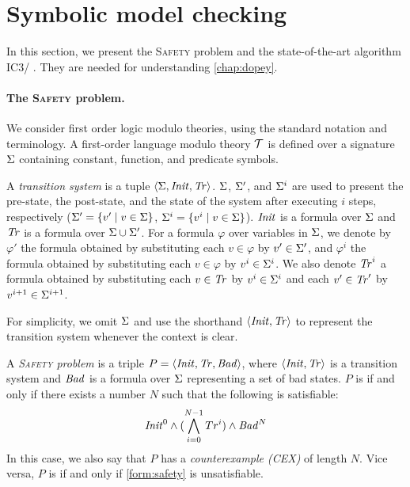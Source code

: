 \section{Symbolic model checking}
\newcommand{\safety}{\textsc{Safety}\xspace}
In this section, we present the \safety problem and the state-of-the-art algorithm IC3/ \spc. They are needed for understanding \cref{chap:dopey}.
\paragraph{The \safety problem.}

We consider first order logic modulo theories, using the standard notation and terminology. A first-order language modulo theory $\mathcal{T}$ is defined over a signature $\Sigma$ containing constant, function, and predicate symbols. 

A \emph{transition system} is a tuple $\langle \Sigma, \mathit{Init},
\mathit{Tr} \rangle$.
$\Sigma$, $\Sigma'$, and $\Sigma^i$ are used to present the pre-state, the post-state, and the state of the system after executing $i$ steps, respectively ($\Sigma' = \{v' \mid v \in \Sigma\}$, $\Sigma^i = \{v^i \mid v \in \Sigma\}$). 
$\mathit{Init}$ is a formula over $\Sigma$ and $\mathit{Tr}$ is a formula over $\Sigma \cup \Sigma'$. For a formula $\varphi$ over variables in $\Sigma$, we denote by $\varphi'$ the formula obtained by substituting each $v \in \varphi$ by $v' \in \Sigma'$, and $\varphi^i$ the formula obtained by substituting each $v \in \varphi$ by $v^i \in \Sigma^i$. We also denote $\mathit{Tr}^i$ a formula obtained by substituting each $v \in \mathit{Tr}$ by $v^i \in \Sigma^i$ and each $v' \in \mathit{Tr}'$ by $v^{i+1} \in \Sigma^{i+1}$.


For simplicity, we omit $\Sigma$ and use the shorthand $\langle \mathit{Init}, \mathit{Tr}\rangle$ to represent the
transition system whenever the context is clear.

A \emph{\safety problem} is a triple 
$P = \langle \mathit{Init}, \mathit{Tr}, \mathit{Bad} \rangle$, where
$\langle \mathit{Init}, \mathit{Tr} \rangle$ is a transition system and $\mathit{Bad}$ is a
formula over $\Sigma$ representing a set of bad states. $P$ is \unsafe if and only
if there exists a number $N$ such that the following is satisfiable:
\begin{align}
\label{form:safety}
    \mathit{Init}^0\land (\bigwedge^{N-1}_{i=0}Tr^i)\land \mathit{Bad}^N
\end{align}
In this case, we also say that $P$ has a \emph{counterexample (CEX)} of length $N$. Vice versa, $P$ is \safe if and only if \cref{form:safety} is unsatisfiable.




